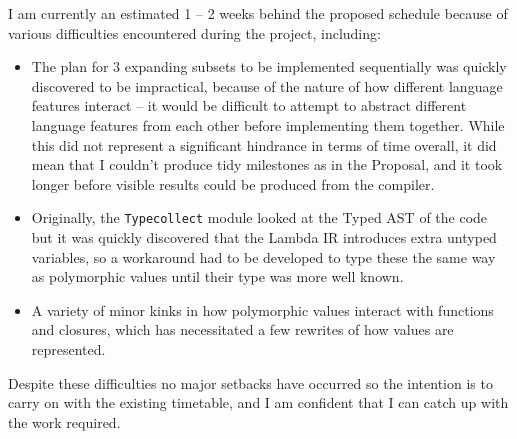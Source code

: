 I am currently an estimated 1 -- 2 weeks behind the proposed schedule because 
of various difficulties encountered during the project, including:

\begin{itemize}
    \item The plan for 3 expanding subsets to be implemented sequentially was 
    quickly discovered to be impractical, because of the nature of how 
    different language features interact -- it would be difficult to attempt to 
    abstract different language features from each other before implementing 
    them together. While this did not represent a significant hindrance in 
    terms of time overall, it did mean that I couldn't produce tidy milestones 
    as in the Proposal, and it took longer before visible results could be 
    produced from the compiler.
    \item Originally, the \texttt{Typecollect} module looked at the Typed AST 
    of the code but it was quickly discovered that the Lambda IR introduces 
    extra untyped variables, so a workaround had to be developed to type these 
    the same way as polymorphic values until their type was more well known.
    \item A variety of minor kinks in how polymorphic values interact with 
    functions and closures, which has necessitated a few rewrites of how values 
    are represented.
\end{itemize}

Despite these difficulties no major setbacks have occurred so the intention is 
to carry on with the existing timetable, and I am confident that I can catch up 
with the work required.
